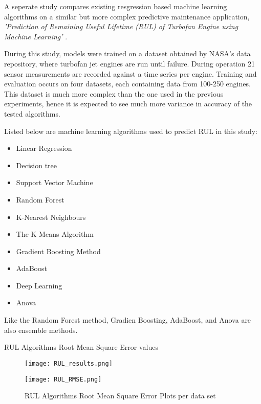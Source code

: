 A seperate study compares existing resgression based machine learning algorithms on a similar but more complex predictive maintenance application,
\textit{'Prediction of Remaining Useful Lifetime (RUL) of Turbofan Engine using Machine Learning'} \cite{RUL}.

During this study, models were trained on a dataset obtained by NASA's data repository, where turbofan jet engines are run until failure.
During operation 21 sensor measurements are recorded against a time series per engine. Training and evaluation occurs on four datasets, each containing data from 100-250 engines. 
This dataset is much more complex than the one used in the previous experiments,
hence it is expected to see much more variance in accuracy of the tested algorithms. 


\enlargethispage{-5\baselineskip}
Listed below are machine learning algorithms used to predict RUL in this study:
\begin{itemize}
    \item Linear Regression
    \item Decision tree
    \item Support Vector Machine
    \item Random Forest
    \item K-Nearest Neighbours
    \item The K Means Algorithm
    \item Gradient Boosting Method
    \item AdaBoost
    \item Deep Learning
    \item Anova 
\end{itemize}
\bigskip

Like the Random Forest method, Gradien Boosting, AdaBoost, and Anova are also ensemble methods.


\begin{table}[h]
    \bigskip
    \caption{RUL Algorithms Root Mean Square Error values\cite{RUL}}
    \begin{figure}[H]
        \texttt{[image: RUL\_results.png]}
        \centering
    \end{figure}
    \label{table:RMSE}
\end{table}

\begin{figure}[H]
    \caption{RUL Algorithms Root Mean Square Error Plots per data set\cite{RUL}}
    \texttt{[image: RUL\_RMSE.png]}
    \label{fig:RMSE Plots}
\end{figure}

